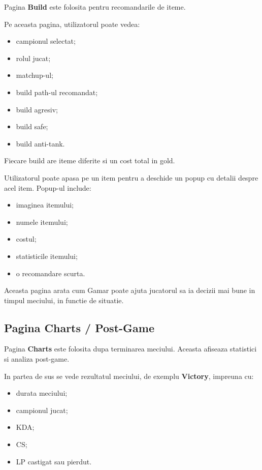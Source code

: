 \documentclass[12pt,a4paper]{article}
\begin{document}
Pagina \textbf{Build} este folosita pentru recomandarile de iteme.

Pe aceasta pagina, utilizatorul poate vedea:

\begin{itemize}
    \item campionul selectat;
    \item rolul jucat;
    \item matchup-ul;
    \item build path-ul recomandat;
    \item build agresiv;
    \item build safe;
    \item build anti-tank.
\end{itemize}

Fiecare build are iteme diferite si un cost total in gold.

Utilizatorul poate apasa pe un item pentru a deschide un popup cu detalii despre acel item. Popup-ul include:

\begin{itemize}
    \item imaginea itemului;
    \item numele itemului;
    \item costul;
    \item statisticile itemului;
    \item o recomandare scurta.
\end{itemize}

Aceasta pagina arata cum Gamar poate ajuta jucatorul sa ia decizii mai bune in timpul meciului, in functie de situatie.

\subsection{Pagina Charts / Post-Game}

Pagina \textbf{Charts} este folosita dupa terminarea meciului. Aceasta afiseaza statistici si analiza post-game.

In partea de sus se vede rezultatul meciului, de exemplu \textbf{Victory}, impreuna cu:

\begin{itemize}
    \item durata meciului;
    \item campionul jucat;
    \item KDA;
    \item CS;
    \item LP castigat sau pierdut.
\end{itemize}
\end{document}
